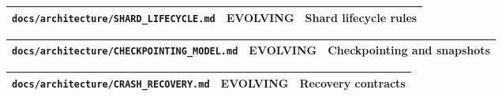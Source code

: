 \documentclass[9pt,a4paper,openany]{book}
\newcommand{\toprule}{\hline}
\newcommand{\midrule}{\hline}
\newcommand{\bottomrule}{\hline}
\begin{document}
\begin{center}
{\small\renewcommand{\arraystretch}{1.18}
\begin{tabularx}{\linewidth}{@{}>{\raggedright\arraybackslash}X >{\raggedright\arraybackslash}X >{\raggedright\arraybackslash}X@{}}
\toprule
\textbf{\texttt{docs/\allowbreak{}architecture/\allowbreak{}SHARD\_\allowbreak{}LIFECYCLE.\allowbreak{}md}} & \textbf{EVOLVING} & \textbf{Shard lifecycle rules} \\
\midrule
\bottomrule
\end{tabularx}
}
\end{center}


\begin{center}
{\small\renewcommand{\arraystretch}{1.18}
\begin{tabularx}{\linewidth}{@{}>{\raggedright\arraybackslash}X >{\raggedright\arraybackslash}X >{\raggedright\arraybackslash}X@{}}
\toprule
\textbf{\texttt{docs/\allowbreak{}architecture/\allowbreak{}CHECKPOINTING\_\allowbreak{}MODEL.\allowbreak{}md}} & \textbf{EVOLVING} & \textbf{Checkpointing and snapshots} \\
\midrule
\bottomrule
\end{tabularx}
}
\end{center}


\begin{center}
{\small\renewcommand{\arraystretch}{1.18}
\begin{tabularx}{\linewidth}{@{}>{\raggedright\arraybackslash}X >{\raggedright\arraybackslash}X >{\raggedright\arraybackslash}X@{}}
\toprule
\textbf{\texttt{docs/\allowbreak{}architecture/\allowbreak{}CRASH\_\allowbreak{}RECOVERY.\allowbreak{}md}} & \textbf{EVOLVING} & \textbf{Recovery contracts} \\
\midrule
\bottomrule
\end{tabularx}
}
\end{center}
\end{document}
